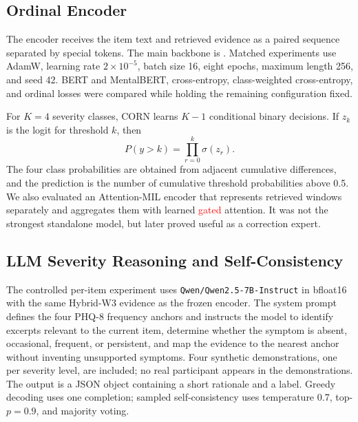 \documentclass{article}
\DeclareRobustCommand{\rev}[1]{\textcolor{red}{#1}}
\begin{document}
\subsection{Ordinal Encoder}
\label{subsec:encoder}
The encoder receives the item text and retrieved evidence as a paired sequence separated by special tokens. The main backbone is . Matched experiments use AdamW, learning rate $2\times10^{-5}$, batch size 16, eight epochs, maximum length 256, and seed 42. BERT and MentalBERT, cross-entropy, class-weighted cross-entropy, and ordinal losses were compared while holding the remaining configuration fixed.

For $K=4$ severity classes, CORN learns $K-1$ conditional binary decisions. If $z_k$ is the logit for threshold $k$, then
\begin{equation}
 P(y>k)=\prod_{r=0}^{k}\sigma(z_r).
\end{equation}
The four class probabilities are obtained from adjacent cumulative differences, and the prediction is the number of cumulative threshold probabilities above 0.5. We also evaluated an Attention-MIL encoder \rev{\cite{ilse2018attention}} that represents retrieved windows separately and aggregates them with learned \rev{gated} attention. It was not the strongest standalone model, but later proved useful as a correction expert.

\subsection{LLM Severity Reasoning and Self-Consistency}
\label{subsec:llm}
The controlled per-item experiment uses \texttt{Qwen/Qwen2.5-7B-Instruct} in bfloat16 with the same Hybrid-W3 evidence as the frozen encoder. The system prompt defines the four PHQ-8 frequency anchors and instructs the model to identify excerpts relevant to the current item, determine whether the symptom is absent, occasional, frequent, or persistent, and map the evidence to the nearest anchor without inventing unsupported symptoms. Four synthetic demonstrations, one per severity level, are included; no real participant appears in the demonstrations. The output is a JSON object containing a short rationale and a label. Greedy decoding uses one completion; sampled self-consistency uses temperature 0.7, top-$p=0.9$, and majority voting.
\end{document}
